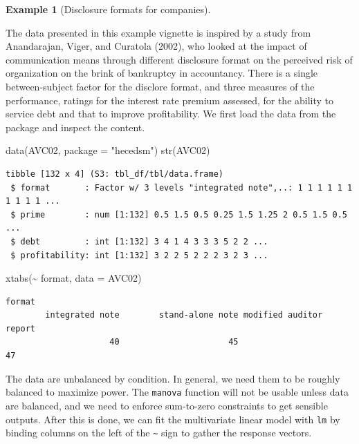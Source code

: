 \documentclass[
  11pt,
  letterpaper,
]{scrbook}
\newenvironment{Shaded}{\begin{snugshade}}{\end{snugshade}}
\newcommand{\AttributeTok}[1]{\textcolor[rgb]{0.40,0.45,0.13}{#1}}
\newcommand{\FunctionTok}[1]{\textcolor[rgb]{0.28,0.35,0.67}{#1}}
\newcommand{\NormalTok}[1]{\textcolor[rgb]{0.00,0.23,0.31}{#1}}
\newcommand{\SpecialCharTok}[1]{\textcolor[rgb]{0.37,0.37,0.37}{#1}}
\newcommand{\StringTok}[1]{\textcolor[rgb]{0.13,0.47,0.30}{#1}}
\theoremstyle{definition}
\newtheorem{example}{Example}[chapter]
\theoremstyle{definition}
\theoremstyle{remark}
\begin{document}
\begin{example}[Disclosure formats for
companies]\protect\hypertarget{exm-avc}{}\label{exm-avc}

The data presented in this example vignette is inspired by a study from
Anandarajan, Viger, and Curatola (2002), who looked at the impact of
communication means through different disclosure format on the perceived
risk of organization on the brink of bankruptcy in accountancy. There is
a single between-subject factor for the disclore format, and three
measures of the performance, ratings for the interest rate premium
assessed, for the ability to service debt and that to improve
profitability. We first load the data from the package and inspect the
content.

\begin{Shaded}
\begin{Highlighting}[]
\FunctionTok{data}\NormalTok{(AVC02, }\AttributeTok{package =} \StringTok{"hecedsm"}\NormalTok{)}
\FunctionTok{str}\NormalTok{(AVC02)}
\end{Highlighting}
\end{Shaded}

\begin{verbatim}
tibble [132 x 4] (S3: tbl_df/tbl/data.frame)
 $ format       : Factor w/ 3 levels "integrated note",..: 1 1 1 1 1 1 1 1 1 1 ...
 $ prime        : num [1:132] 0.5 1.5 0.5 0.25 1.5 1.25 2 0.5 1.5 0.5 ...
 $ debt         : int [1:132] 3 4 1 4 3 3 3 5 2 2 ...
 $ profitability: int [1:132] 3 2 2 5 2 2 2 3 2 3 ...
\end{verbatim}

\begin{Shaded}
\begin{Highlighting}[]
\FunctionTok{xtabs}\NormalTok{(}\SpecialCharTok{\textasciitilde{}}\NormalTok{ format, }\AttributeTok{data =}\NormalTok{ AVC02)}
\end{Highlighting}
\end{Shaded}

\begin{verbatim}
format
        integrated note        stand-alone note modified auditor report 
                     40                      45                      47 
\end{verbatim}

The data are unbalanced by condition. In general, we need them to be
roughly balanced to maximize power. The \texttt{manova} function will
not be usable unless data are balanced, and we need to enforce
sum-to-zero constraints to get sensible outputs. After this is done, we
can fit the multivariate linear model with \texttt{lm} by binding
columns on the left of the \texttt{\textasciitilde{}} sign to gather the
response vectors.


\end{example}
\end{document}
